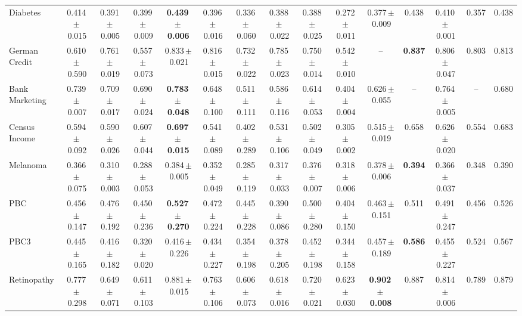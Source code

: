 \documentclass[8pt]{extarticle}
\begin{document}
\begin{longtable}{l*{14}{c}}
Diabetes & 0.414\,$\pm$\,0.015 & 0.391\,$\pm$\,0.005 & 0.399\,$\pm$\,0.009 & \textbf{0.439\,$\pm$\,0.006} & 0.396\,$\pm$\,0.016 & 0.336\,$\pm$\,0.060 & 0.388\,$\pm$\,0.022 & 0.388\,$\pm$\,0.025 & 0.272\,$\pm$\,0.011 & 0.377\,$\pm$\,0.009 & 0.438 & 0.410\,$\pm$\,0.001 & 0.357 & 0.438 \\
German Credit & 0.610\,$\pm$\,0.590 & 0.761\,$\pm$\,0.019 & 0.557\,$\pm$\,0.073 & 0.833\,$\pm$\,0.021 & 0.816\,$\pm$\,0.015 & 0.732\,$\pm$\,0.022 & 0.785\,$\pm$\,0.023 & 0.750\,$\pm$\,0.014 & 0.542\,$\pm$\,0.010 & -- & \textbf{0.837} & 0.806\,$\pm$\,0.047 & 0.803 & 0.813 \\
Bank Marketing & 0.739\,$\pm$\,0.007 & 0.709\,$\pm$\,0.017 & 0.690\,$\pm$\,0.024 & \textbf{0.783\,$\pm$\,0.048} & 0.648\,$\pm$\,0.100 & 0.511\,$\pm$\,0.111 & 0.586\,$\pm$\,0.116 & 0.614\,$\pm$\,0.053 & 0.404\,$\pm$\,0.004 & 0.626\,$\pm$\,0.055 & -- & 0.764\,$\pm$\,0.005 & -- & 0.680 \\
Census Income & 0.594\,$\pm$\,0.092 & 0.590\,$\pm$\,0.026 & 0.607\,$\pm$\,0.044 & \textbf{0.697\,$\pm$\,0.015} & 0.541\,$\pm$\,0.089 & 0.402\,$\pm$\,0.289 & 0.531\,$\pm$\,0.106 & 0.502\,$\pm$\,0.049 & 0.305\,$\pm$\,0.002 & 0.515\,$\pm$\,0.019 & 0.658 & 0.626\,$\pm$\,0.020 & 0.554 & 0.683 \\
Melanoma & 0.366\,$\pm$\,0.075 & 0.310\,$\pm$\,0.003 & 0.288\,$\pm$\,0.053 & 0.384\,$\pm$\,0.005 & 0.352\,$\pm$\,0.049 & 0.285\,$\pm$\,0.119 & 0.317\,$\pm$\,0.033 & 0.376\,$\pm$\,0.007 & 0.318\,$\pm$\,0.006 & 0.378\,$\pm$\,0.006 & \textbf{0.394} & 0.366\,$\pm$\,0.037 & 0.348 & 0.390 \\
PBC & 0.456\,$\pm$\,0.147 & 0.476\,$\pm$\,0.192 & 0.450\,$\pm$\,0.236 & \textbf{0.527\,$\pm$\,0.270} & 0.472\,$\pm$\,0.224 & 0.445\,$\pm$\,0.228 & 0.390\,$\pm$\,0.086 & 0.500\,$\pm$\,0.280 & 0.404\,$\pm$\,0.150 & 0.463\,$\pm$\,0.151 & 0.511 & 0.491\,$\pm$\,0.247 & 0.456 & 0.526 \\
PBC3 & 0.445\,$\pm$\,0.165 & 0.416\,$\pm$\,0.182 & 0.320\,$\pm$\,0.020 & 0.416\,$\pm$\,0.226 & 0.434\,$\pm$\,0.227 & 0.354\,$\pm$\,0.198 & 0.378\,$\pm$\,0.205 & 0.452\,$\pm$\,0.198 & 0.344\,$\pm$\,0.158 & 0.457\,$\pm$\,0.189 & \textbf{0.586} & 0.455\,$\pm$\,0.227 & 0.524 & 0.567 \\
Retinopathy & 0.777\,$\pm$\,0.298 & 0.649\,$\pm$\,0.071 & 0.611\,$\pm$\,0.103 & 0.881\,$\pm$\,0.015 & 0.763\,$\pm$\,0.106 & 0.606\,$\pm$\,0.073 & 0.618\,$\pm$\,0.016 & 0.720\,$\pm$\,0.021 & 0.623\,$\pm$\,0.030 & \textbf{0.902\,$\pm$\,0.008} & 0.887 & 0.814\,$\pm$\,0.006 & 0.789 & 0.879 \\

\end{longtable}
\end{document}
